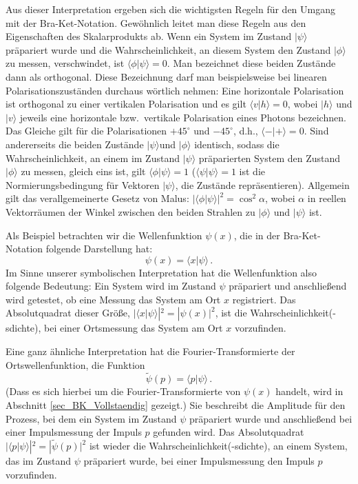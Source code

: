 Aus dieser Interpretation ergeben sich die wichtigsten Regeln f\"ur den Umgang mit der
Bra-Ket-Notation. Gew\"ohnlich leitet man diese Regeln aus den Eigenschaften des Skalarprodukts
ab. Wenn ein System im Zustand $|\psi\rangle$ pr\"apariert wurde und die Wahrscheinlichkeit,
an diesem System den Zustand $|\phi\rangle$ zu messen, verschwindet, ist $\langle \phi|\psi\rangle =0$.
Man bezeichnet diese beiden Zust\"ande dann als orthogonal. Diese Bezeichnung darf man
beispielsweise bei linearen Polarisationszust\"anden durchaus w\"ortlich nehmen: Eine horizontale
Polarisation ist orthogonal zu einer vertikalen Polarisation und es gilt $\langle v|h\rangle=0$,
wobei $|h\rangle$ und $|v\rangle$ jeweils eine horizontale bzw.\ vertikale Polarisation eines Photons
bezeichnen. Das Gleiche gilt f\"ur die Polarisationen $+45^\circ$ und $-45^\circ$, d.h., $\langle -|+\rangle=0$.
Sind andererseits die beiden Zust\"ande $|\psi\rangle $und $|\phi\rangle$ identisch, sodass die
Wahrscheinlichkeit, an einem im Zustand $|\psi\rangle$ pr\"aparierten System den Zustand $|\phi\rangle$ zu
messen, gleich eins ist, gilt $\langle \phi|\psi\rangle=1$ ($\langle \psi|\psi\rangle = 1$ ist die 
Normierungsbedingung f\"ur Vektoren $|\psi\rangle$, die Zust\"ande repr\"asentieren). 
Allgemein gilt das verallgemeinerte Gesetz
von Malus: $|\langle \phi|\psi\rangle|^2 = \cos^2 \alpha$, wobei $\alpha$ in reellen Vektorr\"aumen
der Winkel zwischen den beiden Strahlen zu $|\phi\rangle$ und $|\psi\rangle$ ist. 
 
Als Beispiel betrachten wir die Wellenfunktion $\psi(x)$, die in der Bra-Ket-Notation folgende
Darstellung hat:
\begin{equation} 
            \psi(x) = \langle x | \psi \rangle  \, . 
\end{equation}
Im Sinne unserer symbolischen Interpretation hat die Wellenfunktion also folgende 
Bedeutung: Ein System wird im Zustand $\psi$ pr\"apariert und anschlie\ss end wird
getestet, ob eine Messung das System am Ort $x$ registriert. Das Absolutquadrat
dieser Gr\"o\ss e, $|\langle x|\psi\rangle|^2 = |\psi(x)|^2$, ist die Wahrscheinlichkeit(-sdichte),
bei einer Ortsmessung das System am Ort $x$ vorzufinden.

Eine ganz \"ahnliche Interpretation hat die Fourier-Transformierte der Ortswellenfunktion,
die Funktion
\begin{equation} 
            \tilde{\psi}(p) = \langle p | \psi \rangle  \, . 
\end{equation}
(Dass es sich hierbei um die Fourier-Transformierte von $\psi(x)$ handelt, wird in Abschnitt
\ref{sec_BK_Vollstaendig} gezeigt.) 
Sie beschreibt die Amplitude f\"ur den Prozess, bei dem ein System im Zustand $\psi$
pr\"apariert wurde und anschlie\ss end bei einer Impulsmessung der Impuls $p$
gefunden wird. Das Absolutquadrat $|\langle p|\psi\rangle|^2 = |\tilde{\psi}(p)|^2$
ist wieder die Wahrscheinlichkeit(-sdichte), an einem System, das im Zustand $\psi$
pr\"apariert wurde, bei einer Impulsmessung den Impuls $p$ vorzufinden. 

